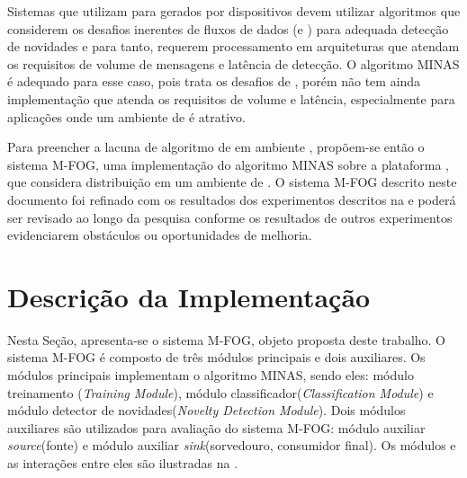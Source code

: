 Sistemas que utilizam \nd para \streams gerados por dispositivos \iot devem
utilizar algoritmos que considerem os desafios inerentes de fluxos de dados
(\evolution e \drift) para adequada detecção de novidades e para tanto,
requerem processamento em arquiteturas
que atendam os requisitos de volume de mensagens e latência de detecção.
O algoritmo MINAS é adequado para esse caso, pois trata os desafios de
\streamMining, porém não tem ainda implementação que atenda os requisitos de
volume e latência, especialmente para aplicações \iot onde um ambiente de \fog é
atrativo.

\newcommand{\mfog}{sistema M-FOG\xspace}


Para preencher a lacuna de algoritmo de \nd em ambiente \fog, propõem-se então
o \mfog, uma implementação do algoritmo MINAS sobre a plataforma \flink, que
considera distribuição em um ambiente de \fog.
O \mfog descrito neste documento foi refinado com os resultados dos experimentos
descritos na  e poderá ser revisado ao longo da pesquisa
conforme os resultados de outros experimentos evidenciarem obstáculos ou
oportunidades de melhoria.


\section{Descrição da Implementação}\label{sec:descricao}

\newcommand{\source}{módulo auxiliar \emph{source}\xspace}
\newcommand{\sink}{módulo auxiliar \emph{sink}\xspace}

\newcommand{\offline}{módulo treinamento\xspace}
\newcommand{\classify}{módulo classificador\xspace}
\newcommand{\detector}{módulo detector de novidades\xspace}

Nesta Seção, apresenta-se o \mfog, objeto proposta deste trabalho.
O \mfog é composto de três módulos principais e dois auxiliares.
Os módulos principais implementam o algoritmo MINAS, sendo eles: \offline
(\emph{Training Module}), \classify (\emph{Classification Module}) e
\detector (\emph{Novelty Detection Module}).
Dois módulos auxiliares são utilizados para avaliação do \mfog:
\source (fonte) e \sink (sorvedouro, consumidor final).
Os módulos e as interações entre eles são ilustradas na .

